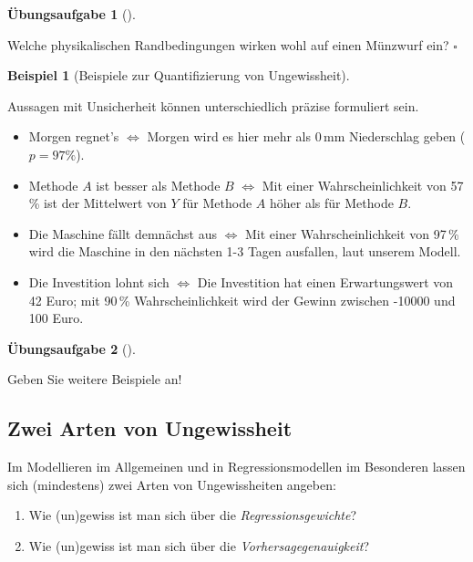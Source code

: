 \documentclass[
  ngerman,
  letterpaper,
  twoside,
  open=any]{scrbook}
\theoremstyle{definition}
\newtheorem{example}{Beispiel}[chapter]
\theoremstyle{plain}
\theoremstyle{definition}
\newtheorem{exercise}{Übungsaufgabe}[chapter]
\theoremstyle{definition}
\theoremstyle{definition}
\newtheorem{example}{Beispiel}[chapter]
\theoremstyle{definition}
\newtheorem{exercise}{Übungsaufgabe}[chapter]
\theoremstyle{remark}
\begin{document}
\begin{exercise}[]\protect\hypertarget{exr-muenz}{}\label{exr-muenz}

Welche physikalischen Randbedingungen wirken wohl auf einen Münzwurf
ein? \(\square\)

\end{exercise}

\begin{example}[Beispiele zur Quantifizierung von
Ungewissheit]\protect\hypertarget{exm-muenz}{}\label{exm-muenz}

Aussagen mit Unsicherheit können unterschiedlich präzise formuliert
sein.

\begin{itemize}
\item
  Morgen regnet's \(\Leftrightarrow\) Morgen wird es hier mehr als 0\,mm
  Niederschlag geben (\(p=97\%\)).
\item
  Methode \(A\) ist besser als Methode \(B\) \(\Leftrightarrow\) Mit
  einer Wahrscheinlichkeit von 57\,\% ist der Mittelwert von \(Y\) für
  Methode \(A\) höher als für Methode \(B\).
\item
  Die Maschine fällt demnächst aus \(\Leftrightarrow\) Mit einer
  Wahrscheinlichkeit von 97\,\% wird die Maschine in den nächsten 1-3
  Tagen ausfallen, laut unserem Modell.
\item
  Die Investition lohnt sich \(\Leftrightarrow\) Die Investition hat
  einen Erwartungswert von 42 Euro; mit 90\,\% Wahrscheinlichkeit wird
  der Gewinn zwischen -10000 und 100 Euro.
\end{itemize}

\end{example}

\begin{exercise}[]\protect\hypertarget{exr-ungewiss}{}\label{exr-ungewiss}

Geben Sie weitere Beispiele an!

\end{exercise}

\subsection{Zwei Arten von
Ungewissheit}\label{zwei-arten-von-ungewissheit}

Im Modellieren im Allgemeinen und in Regressionsmodellen im Besonderen
lassen sich (mindestens) zwei Arten von Ungewissheiten angeben:

\begin{enumerate}
\def\labelenumi{\arabic{enumi}.}
\item
  Wie (un)gewiss ist man sich über die \emph{Regressionsgewichte}?
\item
  Wie (un)gewiss ist man sich über die \emph{Vorhersagegenauigkeit}?
\end{enumerate}
\end{document}
